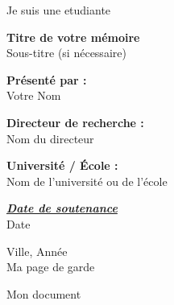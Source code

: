 \documentclass[a4paper,12pt]{article}
\begin{document}
Je suis une etudiante 
\begin{titlepage}
\centering
\vspace*{1cm}

{\Huge \textbf{Titre de votre mémoire}}\\
\vspace{0.5cm}
{\Large Sous-titre (si nécessaire)}\\
\vspace{1.5cm}

\textbf{Présenté par :}\\
{\Large Votre Nom}\\
\vspace{0.5cm}

\textbf{Directeur de recherche :}\\
{\Large Nom du directeur}\\
\vspace{0.5cm}

\textbf{Université / École :}\\
{\Large Nom de l'université ou de l'école}\\
\vspace{0.5cm}

\underline{\textbf{\textit{Date de soutenance}}}\\
{\Large Date}\\

\vfill

{\huge Ville, Année}\\[2cm]
Ma page de garde
\end{titlepage}
Mon document
\end{document}

